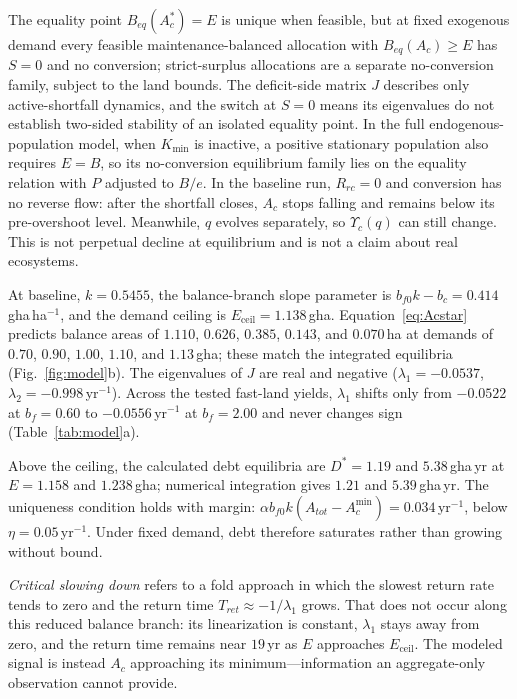 \documentclass[preprint,12pt,authoryear]{elsarticle}
\newcommand{\Ups}{\Upsilon_c}
\newcommand{\Eceil}{E_{\mathrm{ceil}}}
\newcommand{\Acmin}{A_c^{\min}}
\begin{document}
The equality point $B_{eq}(A_c^*)=E$ is unique when feasible, but at fixed exogenous demand every feasible maintenance-balanced allocation with $B_{eq}(A_c)\ge E$ has $S=0$ and no conversion; strict-surplus allocations are a separate no-conversion family, subject to the land bounds. The deficit-side matrix $J$ describes only active-shortfall dynamics, and the switch at $S=0$ means its eigenvalues do not establish two-sided stability of an isolated equality point. In the full endogenous-population model, when $K_{\min}$ is inactive, a positive stationary population also requires $E=B$, so its no-conversion equilibrium family lies on the equality relation with $P$ adjusted to $B/e$. In the baseline run, $R_{rc}=0$ and conversion has no reverse flow: after the shortfall closes, $A_c$ stops falling and remains below its pre-overshoot level. Meanwhile, $q$ evolves separately, so $\Ups(q)$ can still change. This is not perpetual decline at equilibrium and is not a claim about real ecosystems.

At baseline, $k=0.5455$, the balance-branch slope parameter is $b_{f0}k-b_c=0.414$\,gha\,ha$^{-1}$, and the demand ceiling is $\Eceil=1.138$\,gha. Equation~\eqref{eq:Acstar} predicts balance areas of $1.110$, $0.626$, $0.385$, $0.143$, and $0.070$\,ha at demands of $0.70$, $0.90$, $1.00$, $1.10$, and $1.13$\,gha; these match the integrated equilibria (Fig.~\ref{fig:model}b). The eigenvalues of $J$ are real and negative ($\lambda_1=-0.0537$, $\lambda_2=-0.998$\,yr$^{-1}$). Across the tested fast-land yields, $\lambda_1$ shifts only from $-0.0522$ at $b_f=0.60$ to $-0.0556$\,yr$^{-1}$ at $b_f=2.00$ and never changes sign (Table~\ref{tab:model}a).

Above the ceiling, the calculated debt equilibria are $D^*=1.19$ and $5.38$\,gha\,yr at $E=1.158$ and $1.238$\,gha; numerical integration gives $1.21$ and $5.39$\,gha\,yr. The uniqueness condition holds with margin: $\alpha b_{f0}k(A_{tot}-\Acmin)=0.034$\,yr$^{-1}$, below $\eta=0.05$\,yr$^{-1}$. Under fixed demand, debt therefore saturates rather than growing without bound.

\emph{Critical slowing down} refers to a fold approach in which the slowest return rate tends to zero and the return time $T_{ret}\approx-1/\lambda_1$ grows. That does not occur along this reduced balance branch: its linearization is constant, $\lambda_1$ stays away from zero, and the return time remains near $19$\,yr as $E$ approaches $\Eceil$. The modeled signal is instead $A_c$ approaching its minimum—information an aggregate-only observation cannot provide.
\end{document}
